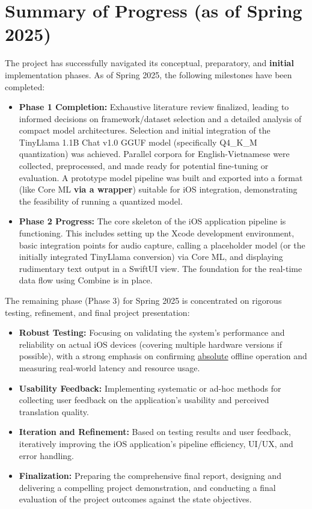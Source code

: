 \documentclass[12pt]{article}
\begin{document}
\section{Summary of Progress (as of Spring 2025)}
The project has successfully navigated its conceptual, preparatory, and \textbf{initial} implementation phases. As of Spring 2025, the following milestones have been completed:
\begin{itemize}
    \item \textbf{Phase 1 Completion:} Exhaustive literature review finalized, leading to informed decisions on framework/dataset selection and a detailed analysis of compact model architectures. Selection and initial integration of the TinyLlama 1.1B Chat v1.0 GGUF model (specifically Q4\_K\_M quantization) was achieved. Parallel corpora for English-Vietnamese were collected, preprocessed, and made ready for potential fine-tuning or evaluation. A prototype model pipeline was built and exported into a format (like Core ML\textbf{ via a wrapper}) suitable for iOS integration, demonstrating the feasibility of running a quantized model. %
    \item \textbf{Phase 2 Progress:} The core skeleton of the iOS application pipeline is functioning. This includes setting up the Xcode development environment, basic integration points for audio capture, calling a placeholder model (or the initially integrated TinyLlama conversion) via Core ML, and displaying rudimentary text output in a SwiftUI view. The foundation for the real-time data flow using Combine is in place.
\end{itemize}
The remaining phase (Phase 3) for Spring 2025 is concentrated on rigorous testing, refinement, and final project presentation:
\begin{itemize}
    \item \textbf{Robust Testing:} Focusing on validating the system's performance and reliability on actual iOS devices (covering multiple hardware versions if possible), with a strong emphasis on confirming \underline{absolute} offline operation and measuring real-world latency and resource usage.
    \item \textbf{Usability Feedback:} Implementing systematic or ad-hoc methods for collecting user feedback on the application's usability and perceived translation quality.
    \item \textbf{Iteration and Refinement:} Based on testing results and user feedback, iteratively improving the iOS application's pipeline efficiency, UI/UX, and error handling.
    \item \textbf{Finalization:} Preparing the comprehensive final report, designing and delivering a compelling project demonstration, and conducting a final evaluation of the project outcomes against the state objectives.
\end{itemize}
\end{document}
